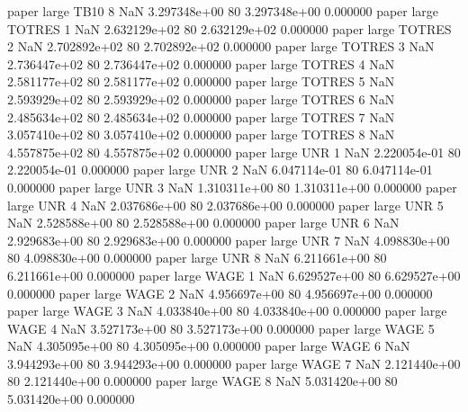             paper      large     TB10                 8                  NaN 3.297348e+00 80   3.297348e+00           0.000000
            paper      large   TOTRES                 1                  NaN 2.632129e+02 80   2.632129e+02           0.000000
            paper      large   TOTRES                 2                  NaN 2.702892e+02 80   2.702892e+02           0.000000
            paper      large   TOTRES                 3                  NaN 2.736447e+02 80   2.736447e+02           0.000000
            paper      large   TOTRES                 4                  NaN 2.581177e+02 80   2.581177e+02           0.000000
            paper      large   TOTRES                 5                  NaN 2.593929e+02 80   2.593929e+02           0.000000
            paper      large   TOTRES                 6                  NaN 2.485634e+02 80   2.485634e+02           0.000000
            paper      large   TOTRES                 7                  NaN 3.057410e+02 80   3.057410e+02           0.000000
            paper      large   TOTRES                 8                  NaN 4.557875e+02 80   4.557875e+02           0.000000
            paper      large      UNR                 1                  NaN 2.220054e-01 80   2.220054e-01           0.000000
            paper      large      UNR                 2                  NaN 6.047114e-01 80   6.047114e-01           0.000000
            paper      large      UNR                 3                  NaN 1.310311e+00 80   1.310311e+00           0.000000
            paper      large      UNR                 4                  NaN 2.037686e+00 80   2.037686e+00           0.000000
            paper      large      UNR                 5                  NaN 2.528588e+00 80   2.528588e+00           0.000000
            paper      large      UNR                 6                  NaN 2.929683e+00 80   2.929683e+00           0.000000
            paper      large      UNR                 7                  NaN 4.098830e+00 80   4.098830e+00           0.000000
            paper      large      UNR                 8                  NaN 6.211661e+00 80   6.211661e+00           0.000000
            paper      large     WAGE                 1                  NaN 6.629527e+00 80   6.629527e+00           0.000000
            paper      large     WAGE                 2                  NaN 4.956697e+00 80   4.956697e+00           0.000000
            paper      large     WAGE                 3                  NaN 4.033840e+00 80   4.033840e+00           0.000000
            paper      large     WAGE                 4                  NaN 3.527173e+00 80   3.527173e+00           0.000000
            paper      large     WAGE                 5                  NaN 4.305095e+00 80   4.305095e+00           0.000000
            paper      large     WAGE                 6                  NaN 3.944293e+00 80   3.944293e+00           0.000000
            paper      large     WAGE                 7                  NaN 2.121440e+00 80   2.121440e+00           0.000000
            paper      large     WAGE                 8                  NaN 5.031420e+00 80   5.031420e+00           0.000000